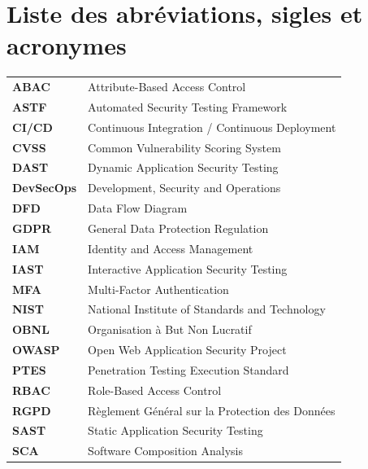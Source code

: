 \documentclass[12pt, a4paper, oneside]{report}
\begin{document}
\chapter*{Liste des abréviations, sigles et acronymes}
\begin{tabular}{ll}
  \textbf{ABAC}      & Attribute-Based Access Control                       \\
  \textbf{ASTF}      & Automated Security Testing Framework                 \\
  \textbf{CI/CD}     & Continuous Integration / Continuous Deployment       \\
  \textbf{CVSS}      & Common Vulnerability Scoring System                  \\
  \textbf{DAST}      & Dynamic Application Security Testing                 \\
  \textbf{DevSecOps} & Development, Security and Operations                 \\
  \textbf{DFD}       & Data Flow Diagram                                    \\
  \textbf{GDPR}      & General Data Protection Regulation                   \\
  \textbf{IAM}       & Identity and Access Management                       \\
  \textbf{IAST}      & Interactive Application Security Testing             \\
  \textbf{MFA}       & Multi-Factor Authentication                          \\
  \textbf{NIST}      & National Institute of Standards and Technology       \\
  \textbf{OBNL}      & Organisation à But Non Lucratif                      \\
  \textbf{OWASP}     & Open Web Application Security Project                \\
  \textbf{PTES}      & Penetration Testing Execution Standard               \\
  \textbf{RBAC}      & Role-Based Access Control                            \\
  \textbf{RGPD}      & Règlement Général sur la Protection des Données      \\
  \textbf{SAST}      & Static Application Security Testing                  \\
  \textbf{SCA}       & Software Composition Analysis                        \\

\end{tabular}
\end{document}
